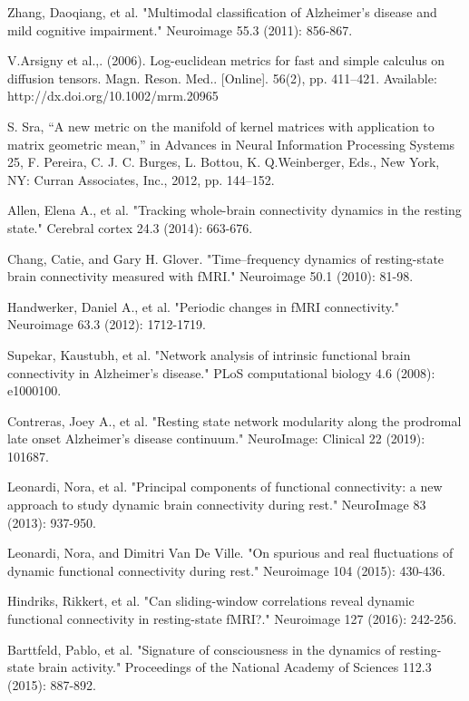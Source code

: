 \documentclass[preprint,12pt]{elsarticle}
\begin{document}
\begin{thebibliography}{1}
			Zhang, Daoqiang, et al. "Multimodal classification of Alzheimer's disease and mild cognitive impairment." Neuroimage 55.3 (2011): 856-867.
			
			V.Arsigny et al.,. (2006). Log-euclidean metrics for fast and simple calculus
			on diffusion tensors. Magn. Reson. Med.. [Online]. 56(2), pp. 411–421.
			Available: http://dx.doi.org/10.1002/mrm.20965
			
			S. Sra, “A new metric on the manifold of kernel matrices with application
			to matrix geometric mean,” in Advances in Neural Information Processing
			Systems 25, F. Pereira, C. J. C. Burges, L. Bottou, K. Q.Weinberger, Eds.,
			New York, NY: Curran Associates, Inc., 2012, pp. 144–152.
			
			Allen, Elena A., et al. "Tracking whole-brain connectivity dynamics in the resting state." Cerebral cortex 24.3 (2014): 663-676.
			
			Chang, Catie, and Gary H. Glover. "Time–frequency dynamics of resting-state brain connectivity measured with fMRI." Neuroimage 50.1 (2010): 81-98.
			
			Handwerker, Daniel A., et al. "Periodic changes in fMRI connectivity." Neuroimage 63.3 (2012): 1712-1719.
			
			Supekar, Kaustubh, et al. "Network analysis of intrinsic functional brain connectivity in Alzheimer's disease." PLoS computational biology 4.6 (2008): e1000100.
			
			Contreras, Joey A., et al. "Resting state network modularity along the prodromal late onset Alzheimer's disease continuum." NeuroImage: Clinical 22 (2019): 101687.
		
			Leonardi, Nora, et al. "Principal components of functional connectivity: a new approach to study dynamic brain connectivity during rest." NeuroImage 83 (2013): 937-950.
	
			Leonardi, Nora, and Dimitri Van De Ville. "On spurious and real fluctuations of dynamic functional connectivity during rest." Neuroimage 104 (2015): 430-436.
			
			Hindriks, Rikkert, et al. "Can sliding-window correlations reveal dynamic functional connectivity in resting-state fMRI?." Neuroimage 127 (2016): 242-256.
			
			Barttfeld, Pablo, et al. "Signature of consciousness in the dynamics of resting-state brain activity." Proceedings of the National Academy of Sciences 112.3 (2015): 887-892.
			

\end{thebibliography}
\end{document}

